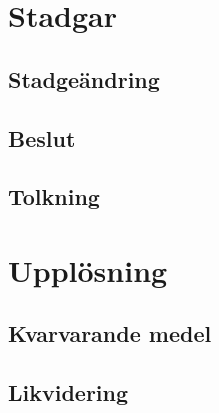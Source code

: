 \documentclass{article}
\begin{document}
\section{Stadgar}
\subsection{Stadgeändring}
\subsection{Beslut}
\subsection{Tolkning}

\section{Upplösning}
\subsection{Kvarvarande medel}
\subsection{Likvidering}
\end{document}
